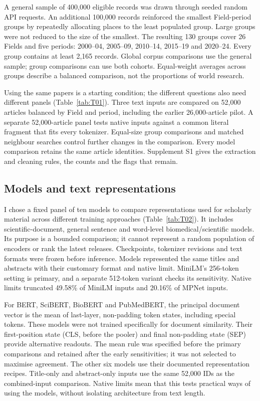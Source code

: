 \documentclass[12pt]{article}
\begin{document}
A general sample of 400,000 eligible records was drawn through seeded random API requests. An additional 100,000 records reinforced the smallest Field-period groups by repeatedly allocating places to the least populated group. Large groups were not reduced to the size of the smallest. The resulting 130 groups cover 26 Fields and five periods: 2000--04, 2005--09, 2010--14, 2015--19 and 2020--24. Every group contains at least 2,165 records. Global corpus comparisons use the general sample; group comparisons can use both cohorts. Equal-weight averages across groups describe a balanced comparison, not the proportions of world research.

Using the same papers is a starting condition; the different questions also need different panels (Table~\ref{tab:T01}). Three text inputs are compared on 52,000 articles balanced by Field and period, including the earlier 26,000-article pilot. A separate 52,000-article panel tests native inputs against a common literal fragment that fits every tokenizer. Equal-size group comparisons and matched neighbour searches control further changes in the comparison. Every model comparison retains the same article identities. Supplement S1 gives the extraction and cleaning rules, the counts and the flags that remain.


\subsection{Models and text representations}
I chose a fixed panel of ten models to compare representations used for scholarly material across different training approaches (Table~\ref{tab:T02}). It includes scientific-document, general sentence and word-level biomedical/scientific models. Its purpose is a bounded comparison; it cannot represent a random population of encoders or rank the latest releases. Checkpoints, tokenizer revisions and text formats were frozen before inference. Models represented the same titles and abstracts with their customary format and native limit. MiniLM's 256-token setting is primary, and a separate 512-token variant checks its sensitivity. Native limits truncated 49.58\% of MiniLM inputs and 20.16\% of MPNet inputs.

For BERT, SciBERT, BioBERT and PubMedBERT, the principal document vector is the mean of last-layer, non-padding token states, including special tokens. These models were not trained specifically for document similarity. Their first-position state (CLS, before the pooler) and final non-padding state (SEP) provide alternative readouts. The mean rule was specified before the primary comparisons and retained after the early sensitivities; it was not selected to maximise agreement. The other six models use their documented representation recipes. Title-only and abstract-only inputs use the same 52,000 IDs as the combined-input comparison. Native limits mean that this tests practical ways of using the models, without isolating architecture from text length.

\end{document}
